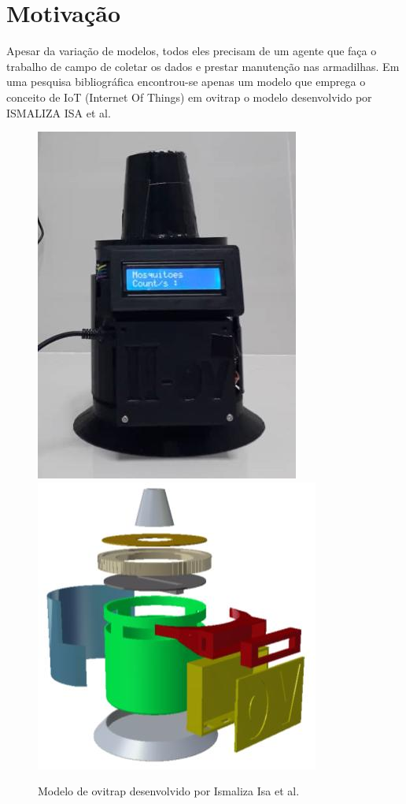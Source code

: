 \documentclass[
	12pt,				%
	openright,			%
	oneside,			%
	a4paper,			%
	chapter=TITLE,		%
	english,			%
	brazil				%
	]{abntex2}
\begin{document}
\section{Motivação}
Apesar da variação de modelos, todos eles precisam de um agente que faça o trabalho de
campo de coletar os dados e prestar manutenção nas armadilhas. Em uma pesquisa
bibliográfica encontrou-se apenas um modelo que emprega o conceito de IoT (Internet Of
Things) em ovitrap o modelo desenvolvido por ISMALIZA ISA et al. \cite{ISMALIZA2019}

\begin{figure}[H]
\centering
\includegraphics[scale=0.4]{imagens/smartovitrap.png}
\includegraphics[scale=0.5]{imagens/smartovitrap2.png}
 \caption{Modelo de ovitrap desenvolvido por Ismaliza Isa et al. }
    \label{fig:ovitrapIsmaliza}
\end{figure}
\end{document}
